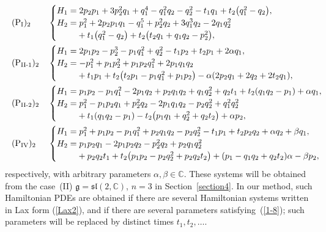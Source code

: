 \documentclass[10pt,a4paper]{amsart}
\numberwithin{equation}{section}
\begin{document}
\begin{align}
& (\text{P}_\text{I})_2 && \begin{cases}
 H_1=2p_2p_1 + 3p_2^2q_1 + q_1^4 - q_1^2q_2 - q_2^2 - t_1q_1 + t_2\big(q_1^2 - q_2\big), \\
H_2= p_1^2 + 2p_2p_1q_1 - q_1^5 + p_2^2q_2 + 3q_1^3q_2 - 2q_1q_2^2 \\
\hphantom{H_2=}{} + t_1 \big(q_1^2-q_2\big) + t_2\big(t_2q_1 + q_1q_2 - p_2^2\big),
\end{cases}\label{4dimP1}\\
& (\text{P}_\text{II-1})_2 && \begin{cases}
 H_1 = 2p_1p_2 - p_2^3-p_1q_1^2 + q_2^2 - t_1p_2 + t_2p_1 + 2 \alpha q_1, \\
 H_2= -p_1^2 + p_1p_2^2 + p_1p_2q_1^2 + 2p_1q_1q_2 \\
\hphantom{H_2=}{} + t_1p_1 + t_2\big(t_2p_1 - p_1q_1^2 + p_1p_2\big) - \alpha (2p_2q_1 + 2q_2 + 2t_2q_1),
\end{cases}\label{4dimP21}\\
& (\text{P}_\text{II-2})_2 && \begin{cases}
 H_1=p_1p_2 - p_1q_1^2 - 2p_1q_2 + p_2q_1q_2 + q_1q_2^2 + q_2t_1 + t_2 (q_1q_2-p_1)+ \alpha q_1, \\
 H_2=p_1^2 - p_1p_2q_1 + p_2^2q_2 - 2p_1q_1q_2 - p_2q_2^2 + q_1^2q_2^2 \\
\hphantom{H_2=}{} + t_1( q_1q_2- p_1) - t_2\big(p_1q_1+q_2^2 + q_2t_2\big) + \alpha p_2,
\end{cases}\hspace*{-10mm}\label{4dimP22}\\
& (\text{P}_\text{IV})_2 && \begin{cases}
 H_1=p_1^2 + p_1p_2 - p_1q_1^2 + p_2q_1q_2- p_2q_2^2 - t_1p_1 + t_2p_2q_2 + \alpha q_2 + \beta q_1, \\
H_2= p_1p_2q_1 - 2p_1p_2q_2 - p_2^2 q_2 + p_2q_1q_2^2 \\
\hphantom{H_2=}{} + p_2q_2 t_1+ t_2\big(p_1p_2 - p_2q_2^2 + p_2q_2t_2\big) + (p_1-q_1q_2 + q_2t_2) \alpha - \beta p_2 ,
\end{cases}\hspace*{-10mm}\label{4dimP4}
\end{align}
respectively, with arbitrary parameters $\alpha, \beta \in \mathbb{C}$. These systems will be obtained from the case~(II) $\mathfrak{g} = \mathfrak{sl}(2, \mathbb{C})$, $n = 3$ in Section~\ref{section4}. In our method, such Hamiltonian PDEs are obtained if there are several Hamiltonian systems written in Lax form (\ref{Lax2}), and if there are several parameters satisfying~(\ref{1-8}); such parameters will be replaced by distinct times $t_1, t_2,\dots $.
\end{document}
